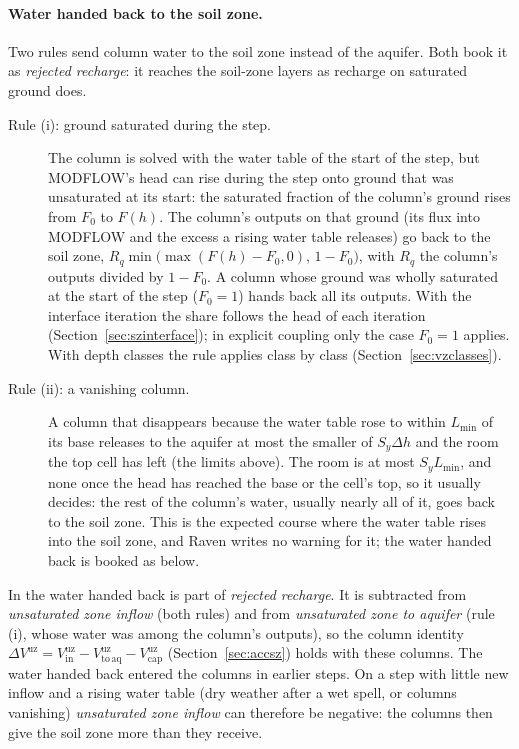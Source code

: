 \paragraph{Water handed back to the soil zone.} Two rules send column water to the soil zone instead of the aquifer.
Both book it as \emph{rejected recharge}: it reaches the soil-zone layers as recharge on saturated ground does.
\begin{description}
\item[Rule (i): ground saturated during the step.] The column is solved with the water table of the start of the step,
but MODFLOW's head can rise during the step onto ground that was unsaturated at its start: the saturated fraction of the
column's ground rises from $F_0$ to $F(h)$. The column's outputs on that ground (its flux into MODFLOW and the excess a
rising water table releases) go back to the soil zone, $R_q\min\big(\max(F(h)-F_0,0),\,1-F_0\big)$, with $R_q$ the
column's outputs divided by $1-F_0$. A column whose ground was wholly saturated at the start of the step ($F_0=1$) hands
back all its outputs. With the interface iteration the share follows the head of each iteration
(Section~\ref{sec:szinterface}); in explicit coupling only the case $F_0=1$ applies. With depth classes the rule applies
class by class (Section~\ref{sec:vzclasses}).
\item[Rule (ii): a vanishing column.] A column that disappears because the water table rose to within $L_{\min}$ of its
base releases to the aquifer at most the smaller of $S_y\Delta h$ and the room the top cell has left (the limits above).
The room is at most $S_y L_{\min}$, and none once the head has reached the base or the cell's top, so it usually decides:
the rest of the column's water, usually nearly all of it, goes back to the soil zone. This is the expected course where
the water table rises into the soil zone, and Raven writes no warning for it; the water handed back is booked as below.
\end{description}
In  the water handed back is part of \emph{rejected recharge}. It is subtracted from \emph{unsaturated
zone inflow} (both rules) and from \emph{unsaturated zone to aquifer} (rule (i), whose water was among the column's
outputs), so the column identity $\Delta V^{\mathrm{uz}}=V^{\mathrm{uz}}_{\mathrm{in}}-V^{\mathrm{uz}}_{\mathrm{to\,aq}}
-V^{\mathrm{uz}}_{\mathrm{cap}}$ (Section~\ref{sec:accsz}) holds with these columns. The water handed back entered the
columns in earlier steps. On a step with little new inflow and a rising water table (dry weather after a wet spell, or
columns vanishing) \emph{unsaturated zone inflow} can therefore be negative: the columns then give the soil zone more
than they receive.

